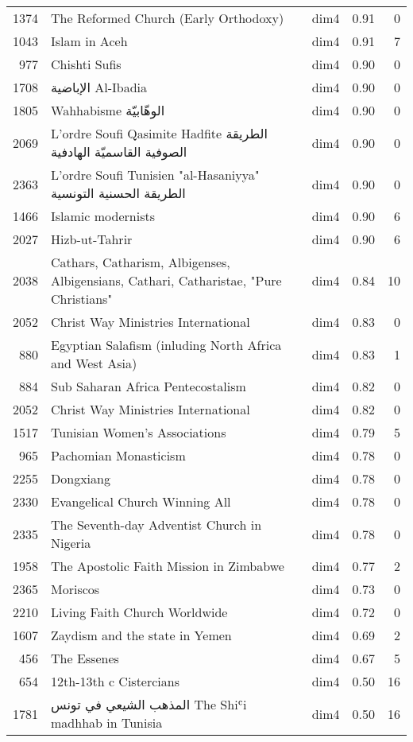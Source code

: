 \begin{tabular}{rllrr}
1374 & The Reformed Church (Early Orthodoxy) & dim4 & 0.91 & 0 \\
1043 & Islam in Aceh & dim4 & 0.91 & 7 \\
977 & Chishti Sufis & dim4 & 0.90 & 0 \\
1708 & الإباضية  Al-Ibadia & dim4 & 0.90 & 0 \\
1805 & Wahhabisme الوهّابيّة & dim4 & 0.90 & 0 \\
2069 & L'ordre Soufi Qasimite Hadfite الطريقة الصوفية القاسميّة الهادفية & dim4 & 0.90 & 0 \\
2363 & L'ordre Soufi Tunisien "al-Hasaniyya" الطريقة الحسنية التونسية & dim4 & 0.90 & 0 \\
1466 & Islamic modernists & dim4 & 0.90 & 6 \\
2027 & Hizb-ut-Tahrir & dim4 & 0.90 & 6 \\
2038 & Cathars, Catharism, Albigenses, Albigensians, Cathari, Catharistae, "Pure Christians" & dim4 & 0.84 & 10 \\
2052 & Christ Way Ministries International & dim4 & 0.83 & 0 \\
880 & Egyptian Salafism (inluding North Africa and West Asia) & dim4 & 0.83 & 1 \\
884 & Sub Saharan Africa Pentecostalism & dim4 & 0.82 & 0 \\
2052 & Christ Way Ministries International & dim4 & 0.82 & 0 \\
1517 & Tunisian Women's Associations & dim4 & 0.79 & 5 \\
965 & Pachomian Monasticism & dim4 & 0.78 & 0 \\
2255 & Dongxiang & dim4 & 0.78 & 0 \\
2330 & Evangelical Church Winning All & dim4 & 0.78 & 0 \\
2335 & The Seventh-day Adventist Church in Nigeria & dim4 & 0.78 & 0 \\
1958 & The Apostolic Faith Mission in Zimbabwe & dim4 & 0.77 & 2 \\
2365 & Moriscos & dim4 & 0.73 & 0 \\
2210 & Living Faith Church Worldwide & dim4 & 0.72 & 0 \\
1607 & Zaydism and the state in Yemen & dim4 & 0.69 & 2 \\
456 & The Essenes & dim4 & 0.67 & 5 \\
654 & 12th-13th c Cistercians & dim4 & 0.50 & 16 \\
1781 & المذهب الشيعي في تونس The Shiʿi madhhab in Tunisia & dim4 & 0.50 & 16 \\

\end{tabular}
